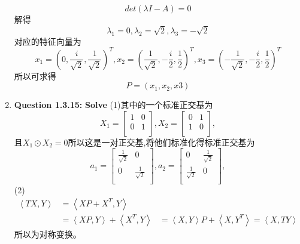 \documentclass[UTF8]{uofa-eng-assignment}
\begin{document}
\begin{enumerate}
$$det(\lambda I-A)=0$$
解得$$\lambda_1=0,\lambda_2=\sqrt{2},\lambda_3=-\sqrt{2}$$
对应的特征向量为
$$
x_1=(0,\frac{i}{\sqrt{2}},\frac{1}{\sqrt{2}})^T,
x_2=(\frac{1}{\sqrt{2}},-\frac{i}{2},\frac{1}{2} )^T,
x_3=(-\frac{1}{\sqrt{2}},-\frac{i}{2},\frac{1}{2} )^T 
$$
所以可求得
$$P=(x_1,x_2,x3)$$
\item \textbf{Question 1.3.15:}
\textbf{Solve}
(1)其中的一个标准正交基为
$$
X_1=\left[
        \begin{matrix}
            1&0\\
            0&1\\
        \end{matrix}\right],
X_2=\left[
        \begin{matrix}
            0&1\\
            1&0\\
        \end{matrix}\right],
$$
且$X_1\odot X_2=0$所以这是一对正交基,将他们标准化得标准正交基为
$$
a_1=\left[
        \begin{matrix}
            \frac{1}{\sqrt{2}}&0\\
            0&\frac{1}{\sqrt{2}}\\
        \end{matrix}\right],
a_2=\left[
        \begin{matrix}
            0&\frac{1}{\sqrt{2}}\\
            \frac{1}{\sqrt{2}}&0\\
        \end{matrix}\right],
$$
(2)
$$
\begin{aligned}
    \left\langle TX,Y \right\rangle&=\left\langle XP+X^T,Y \right\rangle\\
    &=\left\langle XP,Y \right\rangle+\left\langle X^T,Y \right\rangle
    &=\left\langle X,Y \right\rangle P+\left\langle X,Y^T \right\rangle
    = \left\langle X,TY \right\rangle
\end{aligned}
$$
所以为对称变换。



\end{enumerate}
\end{document}
